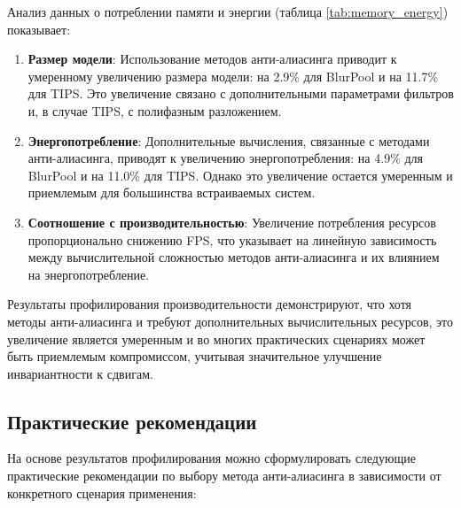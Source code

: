 Анализ данных о потреблении памяти и энергии (таблица \ref{tab:memory_energy}) показывает:

\begin{enumerate}
    \item \textbf{Размер модели}: Использование методов анти-алиасинга приводит к умеренному увеличению размера модели: на 2.9\% для BlurPool и на 11.7\% для TIPS. Это увеличение связано с дополнительными параметрами фильтров и, в случае TIPS, с полифазным разложением.
    
    \item \textbf{Энергопотребление}: Дополнительные вычисления, связанные с методами анти-алиасинга, приводят к увеличению энергопотребления: на 4.9\% для BlurPool и на 11.0\% для TIPS. Однако это увеличение остается умеренным и приемлемым для большинства встраиваемых систем.
    
    \item \textbf{Соотношение с производительностью}: Увеличение потребления ресурсов пропорционально снижению FPS, что указывает на линейную зависимость между вычислительной сложностью методов анти-алиасинга и их влиянием на энергопотребление.
\end{enumerate}

Результаты профилирования производительности демонстрируют, что хотя методы анти-алиасинга и требуют дополнительных вычислительных ресурсов, это увеличение является умеренным и во многих практических сценариях может быть приемлемым компромиссом, учитывая значительное улучшение инвариантности к сдвигам.

\subsection{Практические рекомендации}
\label{experiments:performance:recommendations}

На основе результатов профилирования можно сформулировать следующие практические рекомендации по выбору метода анти-алиасинга в зависимости от конкретного сценария применения:

